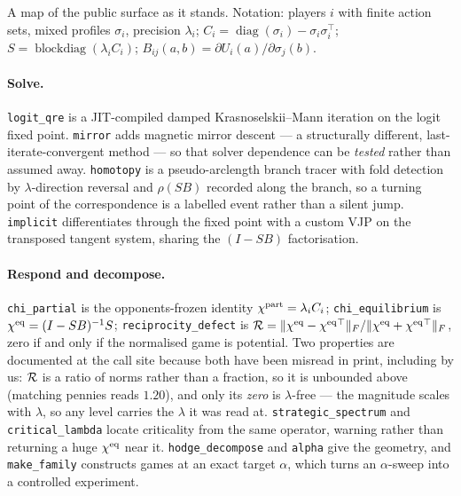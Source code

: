 A map of the public surface as it stands. Notation: players $i$ with finite
action sets, mixed profiles $\sigma_i$, precision $\lambda_i$;
$C_i=\operatorname{diag}(\sigma_i)-\sigma_i\sigma_i^\top$;
$S=\operatorname{blockdiag}(\lambda_iC_i)$;
$B_{ij}(a,b)=\partial U_i(a)/\partial\sigma_j(b)$.

\paragraph{Solve.} \texttt{logit\_qre} is a JIT-compiled damped
Krasnoselskii--Mann iteration on the logit fixed point. \texttt{mirror} adds
magnetic mirror descent \citep{sokota2023} --- a structurally different,
last-iterate-convergent method --- so that solver dependence can be \emph{tested}
rather than assumed away. \texttt{homotopy} is a pseudo-arclength branch tracer
with fold detection by $\lambda$-direction reversal and $\rho(SB)$ recorded along
the branch, so a turning point of the correspondence is a labelled event rather
than a silent jump. \texttt{implicit} differentiates through the fixed point with
a custom VJP on the transposed tangent system, sharing the $(I-SB)$
factorisation.

\paragraph{Respond and decompose.} \texttt{chi\_partial} is the opponents-frozen
identity $\chi^{\mathrm{part}}=\lambda_iC_i$; \texttt{chi\_equilibrium} is
$\chi^{\mathrm{eq}}=(I-SB)^{-1}S$; \texttt{reciprocity\_defect} is
$\mathcal{R}=\lVert\chi^{\mathrm{eq}}-\chi^{\mathrm{eq}}{}^\top\rVert_F/\lVert\chi^{\mathrm{eq}}+\chi^{\mathrm{eq}}{}^\top\rVert_F$, zero
if and only if the normalised game is potential. Two properties are documented at
the call site because both have been misread in print, including by us: $\mathcal{R}$ is a
ratio of norms rather than a fraction, so it is unbounded above (matching pennies
reads $1.20$), and only its \emph{zero} is $\lambda$-free --- the magnitude
scales with $\lambda$, so any level carries the $\lambda$ it was read at.
\texttt{strategic\_spectrum} and \texttt{critical\_lambda} locate criticality
from the same operator, warning rather than returning a huge $\chi^{\mathrm{eq}}$ near it.
\texttt{hodge\_decompose} and \texttt{alpha} give the geometry, and
\texttt{make\_family} constructs games at an exact target $\alpha$, which turns
an $\alpha$-sweep into a controlled experiment.

